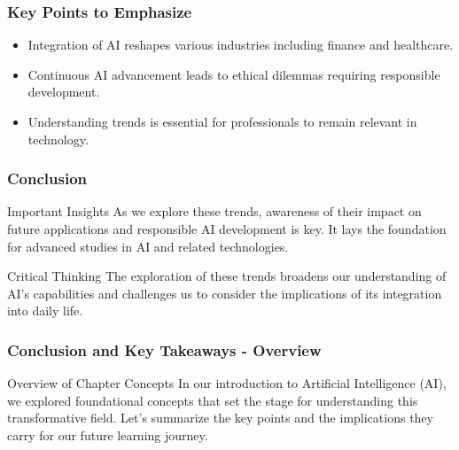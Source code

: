 \documentclass[aspectratio=169]{beamer}
\begin{document}
\begin{frame}[fragile]
    \frametitle{Key Points to Emphasize}
    \begin{itemize}
        \item Integration of AI reshapes various industries including finance and healthcare.
        \item Continuous AI advancement leads to ethical dilemmas requiring responsible development.
        \item Understanding trends is essential for professionals to remain relevant in technology.
    \end{itemize}
\end{frame}

\begin{frame}[fragile]
    \frametitle{Conclusion}
    \begin{block}{Important Insights}
        As we explore these trends, awareness of their impact on future applications and responsible AI development is key. It lays the foundation for advanced studies in AI and related technologies.
    \end{block}
    
    \begin{block}{Critical Thinking}
        The exploration of these trends broadens our understanding of AI's capabilities and challenges us to consider the implications of its integration into daily life.
    \end{block}
\end{frame}

\begin{frame}[fragile]
    \frametitle{Conclusion and Key Takeaways - Overview}
    \begin{block}{Overview of Chapter Concepts}
        In our introduction to Artificial Intelligence (AI), we explored foundational concepts that set the stage for understanding this transformative field. Let’s summarize the key points and the implications they carry for our future learning journey.
    \end{block}
\end{frame}
\end{document}

